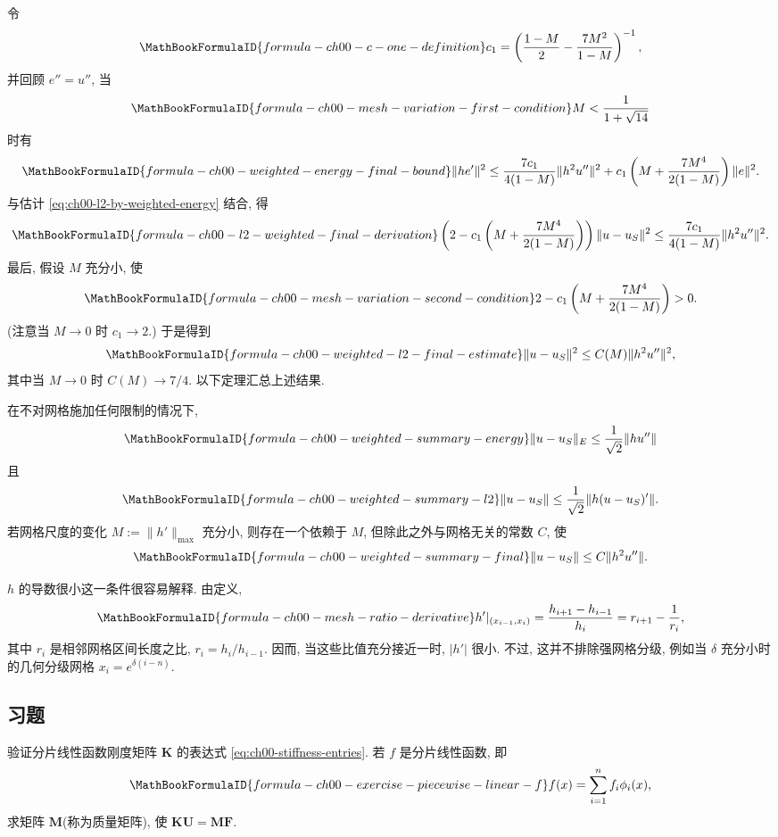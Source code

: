 令
\[
\MathBookFormulaID{formula-ch00-c-one-definition}
c_1=\left(\frac{1-M}{2}-\frac{7M^2}{1-M}\right)^{-1},
\]
并回顾 $e''=u''$, 当
\[
\MathBookFormulaID{formula-ch00-mesh-variation-first-condition}
M<\frac1{1+\sqrt{14}}
\]
时有
\[
\MathBookFormulaID{formula-ch00-weighted-energy-final-bound}
\|he'\|^2
\leq\frac{7c_1}{4(1-M)}\|h^2u''\|^2
+c_1\left(M+\frac{7M^4}{2(1-M)}\right)\|e\|^2.
\]
与估计 \eqref{eq:ch00-l2-by-weighted-energy} 结合, 得
\[
\MathBookFormulaID{formula-ch00-l2-weighted-final-derivation}
\left(2-c_1\left(M+\frac{7M^4}{2(1-M)}\right)\right)\|u-u_S\|^2
\leq\frac{7c_1}{4(1-M)}\|h^2u''\|^2.
\]
最后, 假设 $M$ 充分小, 使
\[
\MathBookFormulaID{formula-ch00-mesh-variation-second-condition}
2-c_1\left(M+\frac{7M^4}{2(1-M)}\right)>0.
\]
(注意当 $M\to0$ 时 $c_1\to2$.) 于是得到
\setcounter{equation}{5}
\begin{equation}
\MathBookFormulaID{formula-ch00-weighted-l2-final-estimate}
\|u-u_S\|^2\leq C(M)\|h^2u''\|^2,
\label{eq:ch00-weighted-l2-final-estimate}
\end{equation}
其中当 $M\to0$ 时 $C(M)\to7/4$. 以下定理汇总上述结果.

\setcounter{thmcount}{6}
\begin{Theorem}
\label{thm:ch00-weighted-norm-summary}
在不对网格施加任何限制的情况下,
\[
\MathBookFormulaID{formula-ch00-weighted-summary-energy}
\|u-u_S\|_E\leq\frac1{\sqrt2}\|hu''\|
\]
且
\[
\MathBookFormulaID{formula-ch00-weighted-summary-l2}
\|u-u_S\|\leq\frac1{\sqrt2}\|h(u-u_S)'\|.
\]
若网格尺度的变化 $M:=\|h'\|_{\max}$ 充分小, 则存在一个依赖于 $M$, 但除此之外与网格无关的常数 $C$, 使
\[
\MathBookFormulaID{formula-ch00-weighted-summary-final}
\|u-u_S\|\leq C\|h^2u''\|.
\]
\end{Theorem}

$h$ 的导数很小这一条件很容易解释. 由定义,
\[
\MathBookFormulaID{formula-ch00-mesh-ratio-derivative}
h'|_{(x_{i-1},x_i)}
=\frac{h_{i+1}-h_{i-1}}{h_i}
=r_{i+1}-\frac1{r_i},
\]
其中 $r_i$ 是相邻网格区间长度之比, $r_i=h_i/h_{i-1}$. 因而, 当这些比值充分接近一时, $|h'|$ 很小. 不过, 这并不排除强网格分级, 例如当 $\delta$ 充分小时的几何分级网格 $x_i=e^{\delta(i-n)}$.

\subsection*{习题}
\label{sec:ch00-exercises}

\setcounter{exerciseitem}{0}
\begin{MBExercise}
\label{ex:ch00-stiffness-and-mass-matrices}
验证分片线性函数刚度矩阵 $\mathbf K$ 的表达式 \eqref{eq:ch00-stiffness-entries}. 若 $f$ 是分片线性函数, 即
\[
\MathBookFormulaID{formula-ch00-exercise-piecewise-linear-f}
f(x)=\sum_{i=1}^nf_i\phi_i(x),
\]
求矩阵 $\mathbf M$(称为质量矩阵), 使 $\mathbf K\mathbf U=\mathbf M\mathbf F$.
\end{MBExercise}

